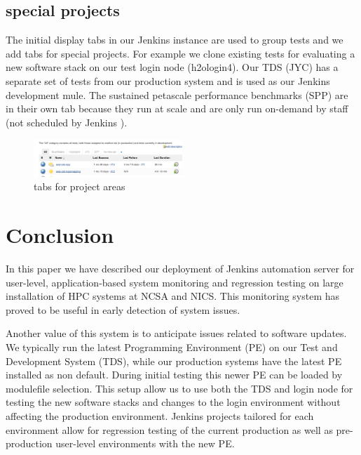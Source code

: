 \documentclass[10pt, conference, compsocconf]{IEEEtran}
\begin{document}
\subsection{special projects}
The initial display tabs in our Jenkins instance are used to group tests and we add tabs for special projects.   For example we clone existing tests for evaluating a new software stack on our test login node (h2ologin4).   Our TDS (JYC) has a separate set of tests from our production system and is used as our Jenkins development mule.  The sustained petascale performance benchmarks (SPP) are in their own tab because they run at scale and are only run on-demand by staff (not scheduled by Jenkins ).
\begin{figure}[H]
\centering
\includegraphics[width=0.5\textwidth]{tabs-display}
\caption{ tabs for project areas }
\label{fig:tabs-display}
\end{figure}

\section{Conclusion}
\label{sec:Conclusion}

In this paper we have described our deployment of Jenkins automation server for user-level, application-based system monitoring and regression testing on large installation of HPC systems at NCSA and NICS. 
This monitoring system has proved to be useful in early detection of system issues. 

Another value of this system is to anticipate issues related to software updates. 
We typically run the latest Programming Environment (PE) on our Test and Development System (TDS), while our production systems have the latest PE installed as non default. 
During initial testing this newer PE can be loaded by modulefile selection. This setup allow us to use both the TDS and login node for testing the new software stacks and changes to the login environment without affecting the production environment. 
Jenkins projects tailored for each environment allow for regression testing of the current production as well as pre-production user-level environments with the new PE.
\end{document}
